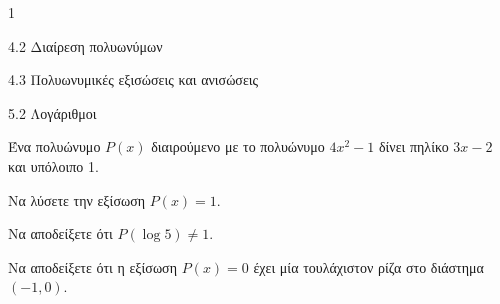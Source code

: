 \begin{ylh}{1}
\item 4.2 Διαίρεση πολυωνύμων
\item 4.3 Πολυωνυμικές εξισώσεις και ανισώσεις
\item 5.2 Λογάριθμοι
\end{ylh}
Ένα πολυώνυμο $P(x)$ διαιρούμενο με το πολυώνυμο $4x^2 - 1$ δίνει πηλίκο $3x - 2$ και υπόλοιπο 1.
\begin{alist}
\item Να λύσετε την εξίσωση $P(x) = 1$.
\item Να αποδείξετε ότι $P(\log 5) \neq 1$.
\item Να αποδείξετε ότι η εξίσωση $P(x) = 0$ έχει μία τουλάχιστον ρίζα στο διάστημα $(-1, 0)$.
\end{alist}

